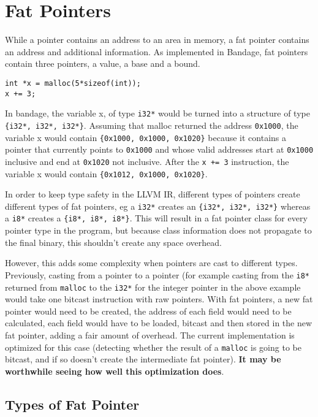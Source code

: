 \section{Fat Pointers}
While a pointer contains an address to an area in memory, a fat pointer contains an address and additional information.
As implemented in Bandage, fat pointers contain three pointers, a value, a base and a bound.

\begin{verbatim}
int *x = malloc(5*sizeof(int));
x += 3;
\end{verbatim}

In bandage, the variable x, of type \verb!i32*! would be turned into a structure of type \verb!{i32*, i32*, i32*}!.
Assuming that malloc returned the address \verb!0x1000!, the variable x would contain \verb!{0x1000, 0x1000, 0x1020}! because it contains a pointer that currently points to \verb!0x1000! and whose valid addresses start at \verb!0x1000! inclusive and end at \verb!0x1020! not inclusive.
After the \verb!x += 3! instruction, the variable x would contain \verb!{0x1012, 0x1000, 0x1020}!.

In order to keep type safety in the LLVM IR, different types of pointers create different types of fat pointers, eg a \verb!i32*! creates an \verb!{i32*, i32*, i32*}! whereas a \verb!i8*! creates a \verb!{i8*, i8*, i8*}!.
This will result in a fat pointer class for every pointer type in the program, but because class information does not propagate to the final binary, this shouldn't create any space overhead.

However, this adds some complexity when pointers are cast to different types.
Previously, casting from a pointer to a pointer (for example casting from the \verb!i8*! returned from \verb!malloc! to the \verb!i32*! for the integer pointer in the above example would take one bitcast instruction with raw pointers.
With fat pointers, a new fat pointer would need to be created, the address of each field would need to be calculated, each field would have to be loaded, bitcast and then stored in the new fat pointer, adding a fair amount of overhead.
The current implementation is optimized for this case (detecting whether the result of a \verb!malloc! is going to be bitcast, and if so doesn't create the intermediate fat pointer).
\textbf{It may be worthwhile seeing how well this optimization does}.

\subsection{Types of Fat Pointer}

